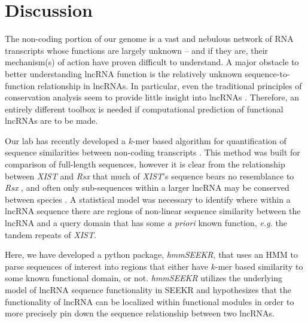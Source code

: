

\section{Discussion}
The non-coding portion of our genome is a vast and nebulous network of RNA transcripts whose functions are largely unknown -- and if they are, their mechanism(s) of action have proven difficult to understand. A major obstacle to better understanding lncRNA function is the relatively unknown sequence-to-function relationship in lncRNAs. In particular, even the traditional principles of conservation analysis seem to provide little insight into lncRNAs \cite{Johnsson2014EvolutionaryFunction,Pang2006RapidFunction,Nesterova2001CharacterizationSequence}. Therefore, an entirely different toolbox is needed if computational prediction of functional lncRNAs are to be made.

Our lab has recently developed a $k$-mer based algorithm for quantification of sequence similarities between non-coding transcripts \cite{Kirk2018FunctionalContent}. This method was built for comparison of full-length sequences, however it is clear from the relationship between \emph{XIST} and \emph{Rsx} that much of \emph{XIST}'s sequence bears no resemblance to \emph{Rsx} \cite{Sprague2019NonlinearDomains}, and often only sub-sequences within a larger lncRNA may be conserved between species \cite{Pang2006RapidFunction,Nesterova2001CharacterizationSequence}. A statistical model was necessary to identify where within a lncRNA sequence there are regions of non-linear sequence similarity between the lncRNA and a query domain that has some \emph{a priori} known function, \textit{e.g.} the tandem repeats of \textit{XIST}. 

Here, we have developed a python package, \emph{hmmSEEKR}, that uses an HMM to parse sequences of interest into regions that either have $k$-mer based similarity to some known functional domain, or not. \emph{hmmSEEKR} utilizes the underlying model of lncRNA sequence functionality in SEEKR \cite{Kirk2018FunctionalContent} and hypothesizes that the functionality of lncRNA can be localized within functional modules \cite{Pang2006RapidFunction, Nesterova2001CharacterizationSequence,Hezroni2015PrinciplesSpecies,Brockdorff2018LocalNcRNA,Sprague2019NonlinearDomains} in order to more precisely pin down the sequence relationship between two lncRNAs. 

